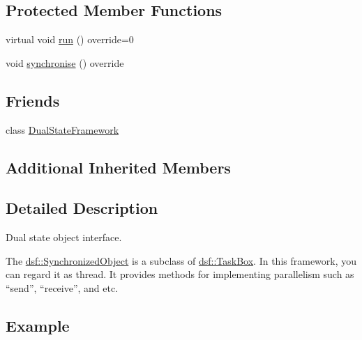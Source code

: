 \subsection*{Protected Member Functions}
\begin{DoxyCompactItemize}
\item 
virtual void \hyperlink{classdsf_1_1_synchronized_object_ae94875bd63d8071f8a563ac45ca7ccc2}{run} () override=0
\item 
void \hyperlink{classdsf_1_1_synchronized_object_a4e200d7b3508db98f09c6fe547f46cdb}{synchronise} () override
\end{DoxyCompactItemize}
\subsection*{Friends}
\begin{DoxyCompactItemize}
\item 
class \hyperlink{classdsf_1_1_synchronized_object_a86db03c65431cb461cc8abf33bd2e74a}{Dual\+State\+Framework}
\end{DoxyCompactItemize}
\subsection*{Additional Inherited Members}


\subsection{Detailed Description}
Dual state object interface. 

The \hyperlink{classdsf_1_1_synchronized_object}{dsf\+::\+Synchronized\+Object} is a subclass of \hyperlink{classdsf_1_1_task_box}{dsf\+::\+Task\+Box}. In this framework, you can regard it as thread. It provides methods for implementing parallelism such as “send”, “receive”, and etc.\hypertarget{classdsf_1_1_synchronized_var_Example}{}\subsection{Example}\label{classdsf_1_1_synchronized_var_Example}

